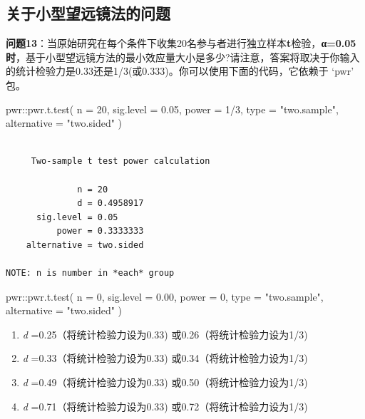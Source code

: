 \documentclass[
  letterpaper,
  DIV=11,
  numbers=noendperiod]{scrreprt}
\newenvironment{Shaded}{\begin{snugshade}}{\end{snugshade}}
\newcommand{\AttributeTok}[1]{\textcolor[rgb]{0.40,0.45,0.13}{#1}}
\newcommand{\DecValTok}[1]{\textcolor[rgb]{0.68,0.00,0.00}{#1}}
\newcommand{\FloatTok}[1]{\textcolor[rgb]{0.68,0.00,0.00}{#1}}
\newcommand{\FunctionTok}[1]{\textcolor[rgb]{0.28,0.35,0.67}{#1}}
\newcommand{\NormalTok}[1]{\textcolor[rgb]{0.00,0.23,0.31}{#1}}
\newcommand{\SpecialCharTok}[1]{\textcolor[rgb]{0.37,0.37,0.37}{#1}}
\newcommand{\StringTok}[1]{\textcolor[rgb]{0.13,0.47,0.30}{#1}}
\providecommand{\tightlist}{%
  \setlength{\itemsep}{0pt}\setlength{\parskip}{0pt}}\usepackage{longtable,booktabs,array}
\begin{document}
\hypertarget{ux5173ux4e8eux5c0fux578bux671bux8fdcux955cux6cd5ux7684ux95eeux9898}{%
\subsection{关于小型望远镜法的问题}\label{ux5173ux4e8eux5c0fux578bux671bux8fdcux955cux6cd5ux7684ux95eeux9898}}

\textbf{问题13}：当原始研究在每个条件下收集20名参与者进行独立样本\textbf{t}检验，\textbf{α=0.05时}，基于小型望远镜方法的最小效应量大小是多少?请注意，答案将取决于你输入的统计检验力是0.33还是1/3(或0.333)。你可以使用下面的代码，它依赖于
`pwr' 包。

\begin{Shaded}
\begin{Highlighting}[]
\NormalTok{pwr}\SpecialCharTok{::}\FunctionTok{pwr.t.test}\NormalTok{(}
  \AttributeTok{n =} \DecValTok{20}\NormalTok{,}
  \AttributeTok{sig.level =} \FloatTok{0.05}\NormalTok{,}
  \AttributeTok{power =} \DecValTok{1}\SpecialCharTok{/}\DecValTok{3}\NormalTok{,}
  \AttributeTok{type =} \StringTok{"two.sample"}\NormalTok{,}
  \AttributeTok{alternative =} \StringTok{"two.sided"}
\NormalTok{)}
\end{Highlighting}
\end{Shaded}

\begin{verbatim}

     Two-sample t test power calculation 

              n = 20
              d = 0.4958917
      sig.level = 0.05
          power = 0.3333333
    alternative = two.sided

NOTE: n is number in *each* group
\end{verbatim}

\begin{Shaded}
\begin{Highlighting}[]
\NormalTok{pwr}\SpecialCharTok{::}\FunctionTok{pwr.t.test}\NormalTok{(}
  \AttributeTok{n =} \DecValTok{0}\NormalTok{, }
  \AttributeTok{sig.level =} \FloatTok{0.00}\NormalTok{, }
  \AttributeTok{power =} \DecValTok{0}\NormalTok{, }
  \AttributeTok{type =} \StringTok{"two.sample"}\NormalTok{,}
  \AttributeTok{alternative =} \StringTok{"two.sided"}
\NormalTok{)}
\end{Highlighting}
\end{Shaded}

\begin{enumerate}
\def\labelenumi{\Alph{enumi})}
\tightlist
\item
  \emph{d} =0.25（将统计检验力设为0.33) 或0.26（将统计检验力设为1/3)
\item
  \emph{d} =0.33（将统计检验力设为0.33) 或0.34（将统计检验力设为1/3)
\item
  \emph{d} =0.49（将统计检验力设为0.33) 或0.50（将统计检验力设为1/3)
\item
  \emph{d} =0.71（将统计检验力设为0.33) 或0.72（将统计检验力设为1/3)
\end{enumerate}
\end{document}
